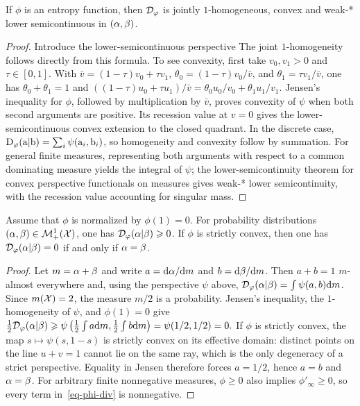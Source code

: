 \begin{proposition}\label{prop-basic-phi-divergence-properties}
If $\phi$ is an entropy function, then $\mathcal{D}_\varphi$ is jointly $1$-homogeneous, convex and weak-* lower semicontinuous in $(\alpha,\beta)$.
\end{proposition}
\begin{proof}
Introduce the lower-semicontinuous perspective
The joint $1$-homogeneity follows directly from this formula. To see convexity, first take $v_0,v_1>0$ and $\tau\in[0,1]$. With $\bar v=(1-\tau)v_0+\tau v_1$,
$\theta_0=(1-\tau)v_0/\bar v$, and $\theta_1=\tau v_1/\bar v$, one has
$\theta_0+\theta_1=1$ and
$((1-\tau)u_0+\tau u_1)/\bar v
=\theta_0u_0/v_0+\theta_1u_1/v_1$.
Jensen's inequality for $\phi$, followed by multiplication by $\bar v$, proves convexity of $\psi$ when both second arguments are positive. Its recession value at $v=0$ gives the lower-semicontinuous convex extension to the closed quadrant. In the discrete case,
\(\mathrm{D}_\varphi(\mathrm{a}|\mathrm{b}) = \sum_i \psi(\mathrm{a}_i,\mathrm{b}_i)\),
so homogeneity and convexity follow by summation. For general finite measures, representing both arguments with respect to a common dominating measure yields the integral of $\psi$; the lower-semicontinuity theorem for convex perspective functionals on measures gives weak-* lower semicontinuity, with the recession value accounting for singular mass.
\end{proof}
\begin{proposition}\label{phi-div-positive}
Assume that $\phi$ is normalized by $\phi(1)=0$. For probability distributions $(\alpha,\beta) \in \mathcal{M}_+^1(\mathcal{X})$, one has $\mathcal{D}_\varphi(\alpha|\beta) \geqslant 0$. If $\phi$ is strictly convex, then one has $\mathcal{D}_\varphi(\alpha|\beta)=0$ if and only if $\alpha=\beta$.
\end{proposition}
\begin{proof}
Let $m=\alpha+\beta$ and write $a=\mathrm{d}\alpha/\mathrm{d} m$ and $b=\mathrm{d}\beta/\mathrm{d} m$. Then $a+b=1$ $m$-almost everywhere and, using the perspective $\psi$ above,
\(\mathcal{D}_\varphi(\alpha|\beta)=\int \psi(a,b)\mathrm{d} m\).
Since $m(\mathcal{X})=2$, the measure $m/2$ is a probability. Jensen's inequality, the $1$-homogeneity of $\psi$, and $\phi(1)=0$ give
\(\frac12\mathcal{D}_\varphi(\alpha|\beta) \geqslant \psi\left( \frac12\int a\mathrm{d} m,\frac12\int b\mathrm{d} m \right) =\psi(1/2,1/2)=0.\)
If $\phi$ is strictly convex, the map $s\mapsto\psi(s,1-s)$ is strictly convex on its effective domain: distinct points on the line $u+v=1$ cannot lie on the same ray, which is the only degeneracy of a strict perspective. Equality in Jensen therefore forces $a=1/2$, hence $a=b$ and $\alpha=\beta$. For arbitrary finite nonnegative measures, $\phi\geq0$ also implies $\phi'_\infty\geq0$, so every term in~\eqref{eq-phi-div} is nonnegative.
\end{proof}
